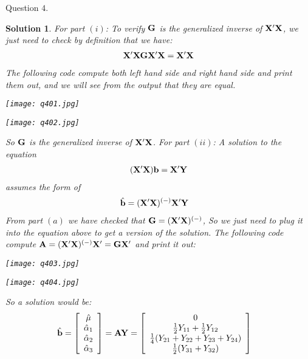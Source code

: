 \documentclass[11pt]{article}
\newtheorem{sol}{Solution}
\begin{document}
Question $4$.
\begin{sol}
	For part $(i)$:\vskip 2mm
	To verify ${\bf G}$ is the generalized inverse of ${\bf X}'{\bf X}$, we just need to check by definition that we have:
	\begin{align*}
		{\bf X}'{\bf X}{\bf G}{\bf X}'{\bf X} = {\bf X}'{\bf X}
	\end{align*}
	The following code compute both left hand side and right hand side and print them out, and we will see from the output that they are equal.
	\begin{center}
		\texttt{[image: q401.jpg]}
	\end{center}
	\begin{center}
		\texttt{[image: q402.jpg]}
	\end{center}
	So ${\bf G}$ is the generalized inverse of ${\bf X}'{\bf X}$.\vskip 2mm
	For part $(ii)$:\vskip 2mm
	A solution to the equation
	\begin{align*}
		({\bf X}'{\bf X}){\bf b} = {\bf X}'{\bf Y}
	\end{align*}
	assumes the form of 
	\begin{align*}
		\hat{{\bf b}} &= ({\bf X}'{\bf X})^{(-)}{\bf X}'{\bf Y}
	\end{align*}
	From part $(a)$ we have checked that ${\bf G} = ({\bf X}'{\bf X})^{(-)}$, So we just need to plug it into the equation above to get a version of the solution.\vskip 2mm
	The following code compute ${\bf A} = ({\bf X}'{\bf X})^{(-)}{\bf X}' = {\bf G}{\bf X}'$ and print it out:
	\begin{center}
		\texttt{[image: q403.jpg]}
	\end{center}
	\begin{center}
		\texttt{[image: q404.jpg]}
	\end{center}
	So a solution would be:
	\begin{align*}
		\hat{{\bf b}} &= \left[\begin{array}{c}\hat{\mu} \\ \hat{\alpha}_1\\ \hat{\alpha}_2\\ \hat{\alpha}_3  \end{array}\right] = {\bf A}{\bf Y} = \left[\begin{array}{c}0 \\ \frac{1}{2}Y_{11} + \frac{1}{2}Y_{12} \\ \frac{1}{4}(Y_{21} + Y_{22} + Y_{23} + Y_{24})\\ \frac{1}{2}(Y_{31} + Y_{32}) \end{array}\right]

\end{align*}
\end{sol}
\end{document}
